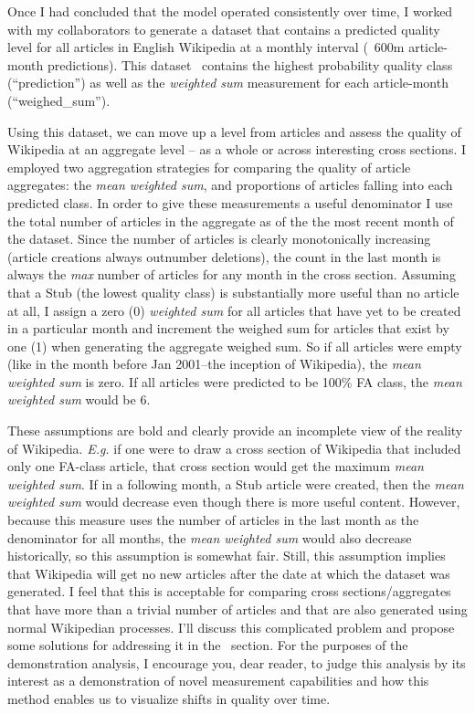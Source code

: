 Once I had concluded that the model operated consistently over time, I worked with my collaborators to generate a dataset that contains a predicted quality level for all articles in English Wikipedia at a monthly interval (~600m article-month predictions).  This dataset~\cite{halfaker16monthly} contains the highest probability quality class (``prediction'') as well as the \emph{weighted sum} measurement for each article-month (``weighed\_sum'').



 Using this dataset, we can move up a level from articles and assess the quality of Wikipedia at an aggregate level -- as a whole or across interesting cross sections.  I employed two aggregation strategies for comparing the quality of article aggregates: the \emph{mean weighted sum}, and proportions of articles falling into each predicted class.  In order to give these measurements a useful denominator I use the total number of articles in the aggregate as of the the most recent month of the dataset.  Since the number of articles is clearly monotonically increasing (article creations always outnumber deletions), the count in the last month is always the \emph{max} number of articles for any month in the cross section.  Assuming that a Stub (the lowest quality class) is substantially more useful than no article at all, I assign a zero (0) \emph{weighted sum} for all articles that have yet to be created in a particular month and increment the weighed sum for articles that exist by one (1) when generating the aggregate weighed sum.  So if all articles were empty (like in the month before Jan 2001--the inception of Wikipedia), the \emph{mean weighted sum} is zero.  If all articles were predicted to be 100\% FA class, the \emph{mean weighted sum} would be 6.

These assumptions are bold and clearly provide an incomplete view of the reality of Wikipedia.  \emph{E.g.} if one were to draw a cross section of Wikipedia that included only one FA-class article, that cross section would get the maximum \emph{mean weighted sum}.  If in a following month, a Stub article were created, then the \emph{mean weighted sum} would decrease even though there is more useful content.  However, because this measure uses the number of articles in the last month as the denominator for all months, the \emph{mean weighted sum} would also decrease historically, so this assumption is somewhat fair.  Still, this assumption implies that Wikipedia will get no new articles after the date at which the dataset was generated.  I feel that this is acceptable for comparing cross sections/aggregates that have more than a trivial number of articles and that are also generated using normal Wikipedian processes.  I'll discuss this complicated problem and propose some solutions for addressing it in the ~section.  For the purposes of the demonstration analysis, I encourage you, dear reader, to judge this analysis by its interest as a demonstration of novel measurement capabilities and how this method enables us to visualize shifts in quality over time.
